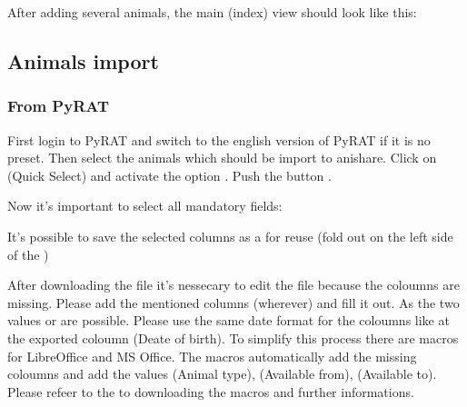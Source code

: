 \documentclass[letterpaper,10pt,openany,oneside,english]{sphinxmanual}
\begin{document}
After adding several animals, the main (index) view should look like this:

\noindent{}


\subsection{Animals import}
\label{\detokenize{index:animals-import}}

\subsubsection{From PyRAT}
\label{\detokenize{index:from-pyrat}}
First login to PyRAT and switch to the english version of PyRAT if it is no preset. Then select the animals which
should be import to anishare. Click on  (Quick Select) and activate the option .
Push the button .

\noindent{}

Now it’s important to select all mandatory fields:

It’s possible to save the selected columns as a  for reuse (fold out  on the left side of the )

\noindent{}

After downloading the file it’s nessecary to edit the file because the coloumns  are missing.
Please add the mentioned columns (wherever) and fill it out. As  the two values  or  are possible.
Please use the same date format for the coloumns  like at the exported coloumn  (Deate of birth).
To simplify this process there are macros for LibreOffice and MS Office. The macros automatically add the missing coloumns and add the values
 (Animal type),  (Available from),  (Available to).
Please refeer to the  to downloading the macros and further informations.
\end{document}
